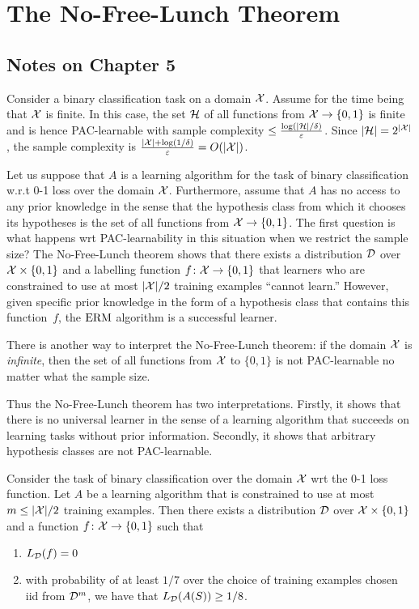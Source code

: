\chapter{The No-Free-Lunch Theorem}

\section*{Notes on Chapter 5}

Consider a binary classification task on a domain $\mathcal{X}$. Assume for the time
being that $\mathcal{X}$ is finite. In this case, the set $\mathcal{H}$ of all functions
from $\mathcal{X} \rightarrow \{0, 1\}$ is finite and is hence PAC-learnable with
sample complexity $\leq \frac{\log (|\mathcal{H}| / \delta)}{\varepsilon}$.  Since
$|\mathcal{H}| = 2^{|\mathcal{X}|}$, the sample complexity is $\frac{|\mathcal{X}| + \log (1 /
\delta)}{\varepsilon} = O(|\mathcal{X}|)$.

Let us suppose that $A$ is a learning algorithm for the task of binary
classification w.r.t 0-1 loss over the domain $\mathcal{X}$. Furthermore, assume
that $A$ has no access to any prior knowledge in the sense that the hypothesis
class from which it chooses its hypotheses is the set of all functions from
$\mathcal{X} \rightarrow \{0, 1\}$.
The first question is what happens wrt PAC-learnability in this situation when
we restrict the sample size? The No-Free-Lunch theorem shows that there exists
a distribution $\mathcal{D}$ over $\mathcal{X} \times \{0, 1\}$ and a labelling function $f
\colon \mathcal{X} \rightarrow \{0, 1\}$ that learners who are  constrained to use at
most $|\mathcal{X}| / 2$ training examples ``cannot learn.'' However, given specific prior
knowledge in the form of a hypothesis class that contains this function~$f$, the
$\operatorname{ERM}$ algorithm is a successful learner.


There is another way to interpret the No-Free-Lunch theorem: if the domain
$\mathcal{X}$ is \emph{infinite}, then the set of all functions from $\mathcal{X}$ to
$\{0, 1\}$ is not PAC-learnable no matter what the sample size.

Thus the No-Free-Lunch theorem has two interpretations. Firstly, it shows that there
is no universal learner in the sense of a learning algorithm that succeeds on
learning tasks without prior information. Secondly, it shows that arbitrary hypothesis
classes are not PAC-learnable.


\begin{theorem}
\label{thm:no_free_lunch}
Consider the task of binary classification over the domain $\mathcal{X}$ wrt the 0-1
loss function. Let $A$ be a learning algorithm that is constrained to use at
most $m \leq |\mathcal{X}| / 2$ training examples. Then there exists a distribution
$\mathcal{D}$ over $\mathcal{X} \times \{0, 1\}$ and a function $f \colon \mathcal{X} \rightarrow
\{0, 1\}$ such that
\begin{enumerate}
    \item $L_{\mathcal{D}} (f) = 0$
    \item with probability of at least $1/7$ over the choice of training examples
        chosen iid from $\mathcal{D}^{m}$, we have that $L_{\mathcal{D}} (A(S)) \geq 1/ 8$.
\end{enumerate}
\end{theorem}


